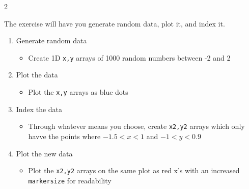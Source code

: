 \documentclass[12pt]{article}%
\newcommand{\code}[1]{\texttt{#1}}
\begin{document}
\begin{multicols*}{2}
\begin{Exercise}[origin={20 points, Python}]
The exercise will have you generate random data, plot it, and index it.

\begin{enumerate}[leftmargin=*]
	\item Generate random data
	\begin{itemize}[leftmargin=*]
		\item Create 1D \code{x,y} arrays of 1000 random numbers between -2 and 2
	\end{itemize}
	\item Plot the data
	\begin{itemize}[leftmargin=*]
		\item Plot the \code{x,y} arrays as blue dots
	\end{itemize}
	\item Index the data
	\begin{itemize}[leftmargin=*]
		\item Through whatever means you choose, create \code{x2,y2} arrays which only havve the points where $-1.5<x<1$ and $-1<y<0.9$
	\end{itemize}
	\item Plot the new data
	\begin{itemize}[leftmargin=*]
		\item Plot the \code{x2,y2} arrays on the same plot as red x's with an increased \code{markersize} for readability
	\end{itemize}
\end{enumerate}

\end{Exercise}

\vfill\null
\columnbreak



\vfill\null
\end{multicols*}
\end{document}
